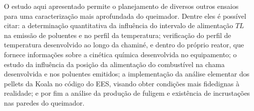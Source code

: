 O estudo aqui apresentado permite o planejamento de diversos outros ensaios para uma caracterização mais aprofundada do queimador. Dentre eles é possível citar: a determinação quantitativa da influência do intervalo de alimentação $TL$ na emissão de poluentes e no perfil da temperatura; verificação do perfil de temperatura desenvolvido ao longo da chaminé, e dentro do próprio reator, que fornece informações sobre a cinética química desenvolvida no equipamento; o estudo da influência da posição da alimentação do combustível na chama desenvolvida e nos poluentes emitidos; a implementação da análise elementar dos pellets da Koala no código do EES, visando obter condições mais fidedignas à realidade; e por fim a análise da produção de fuligem e existência de incrustações nas paredes do queimador.




